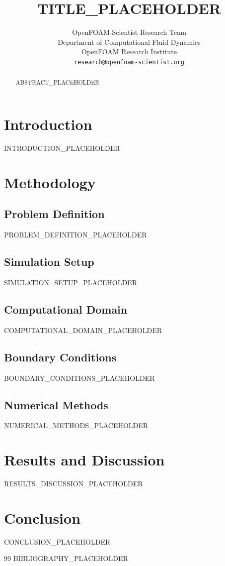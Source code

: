 \documentclass{article}
\title{TITLE_PLACEHOLDER}
\author{%
  OpenFOAM-Scientist Research Team \\
  Department of Computational Fluid Dynamics \\
  OpenFOAM Research Institute \\
  \texttt{research@openfoam-scientist.org} \\
}
\begin{document}
\maketitle

\begin{abstract}
ABSTRACT_PLACEHOLDER
\end{abstract}

\section{Introduction}
INTRODUCTION_PLACEHOLDER

\section{Methodology}
\subsection{Problem Definition}
PROBLEM_DEFINITION_PLACEHOLDER

\subsection{Simulation Setup}
SIMULATION_SETUP_PLACEHOLDER

\subsection{Computational Domain}
COMPUTATIONAL_DOMAIN_PLACEHOLDER

\subsection{Boundary Conditions}
BOUNDARY_CONDITIONS_PLACEHOLDER

\subsection{Numerical Methods}
NUMERICAL_METHODS_PLACEHOLDER

\section{Results and Discussion}
RESULTS_DISCUSSION_PLACEHOLDER

\section{Conclusion}
CONCLUSION_PLACEHOLDER


\begin{thebibliography}{99}
BIBLIOGRAPHY_PLACEHOLDER
\end{thebibliography}
\end{document}
